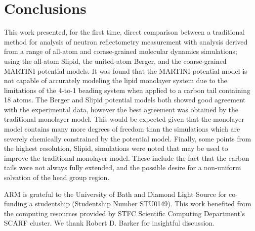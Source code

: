 \documentclass[amsmath,amssymb,twocolumn,superscriptaddress]{revtex4-1}
\begin{document}
\section{Conclusions}
This work presented, for the first time, direct comparison between a traditional method for analysis of neutron reflectometry measurement with analysis derived from a range of all-atom and corase-grained molecular dynamics simulations; using the all-atom Slipid, the united-atom Berger, and the coarse-grained MARTINI potential models.
It was found that the MARTINI potential model is not capable of accurately modeling the lipid monolayer system due to the limitations of the 4-to-1 beading system when applied to a carbon tail containing 18 atoms.
The Berger and Slipid potential models both showed good agreement with the experimental data, however the best agreement was obtained by the traditional monolayer model.
This would be expected given that the monolayer model contains many more degrees of freedom than the simulations which are severely chemically constrained by the potential model.
Finally, some points from the highest resolution, Slipid, simulations were noted that may be used to improve the traditional monolayer model.
These include the fact that the carbon tails were not always fully extended, and the possible desire for a non-uniform solvation of the head group region.

\begin{acknowledgements}
ARM is grateful to the University of Bath and Diamond Light Source for co-funding a studentship (Studentship Number STU0149). This work benefited from the computing resources provided by STFC Scientific Computing Department's SCARF cluster.
We thank Robert D. Barker for insightful discussion.
\end{acknowledgements}


\end{document}
